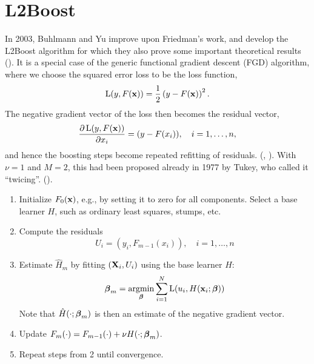 \section{L2Boost}
In 2003, Buhlmann and Yu improve upon Friedman's work, and develop the L2Boost algorithm for which they also prove some important theoretical results (\cite{buhlmann-yu}). It is a special case of the generic functional gradient descent (FGD) algorithm, where we choose the squared error loss to be the loss function,
\begin{equation*}
    \operatorname{L}(y,F(\mathbf{x}))=\frac{1}{2}\left(y-F(\mathbf{x})\right)^2.
\end{equation*}
The negative gradient vector of the loss then becomes the residual vector,
\begin{equation*}
    \frac{\partial\operatorname{L}(y,F(\mathbf{x}))}{\partial x_i}=(y-F(x_i)),\quad i=1,\dotsc,n,
\end{equation*}
and hence the boosting steps become repeated refitting of residuals. (\cite{friedman2001}, \cite{buhlmann-yu}). With $\nu=1$ and $M=2$, this had been proposed already in 1977 by Tukey, who called it ``twicing''. (\cite{tukey}).
\begin{enumerate}
    \item Initialize $F_0(\mathbf{x})$, e.g., by setting it to zero for all components. Select a base learner $H$, such as ordinary least squares, stumps, etc.
    \item Compute the residuals
        \begin{equation*}
            U_i=(y_i,F_{m-1}(x_i)),\quad i=1,\dotsc,n
        \end{equation*}
    \item Estimate $\hat{H}_m$ by fitting $(\mathbf{X}_i,U_i)$ using the base learner $H$:
        \begin{equation*}
            \boldsymbol{\beta}_m=\operatorname*{argmin}_{\boldsymbol{\beta}}\sum_{i=1}^N\operatorname{L}(u_i,H(\mathbf{x}_i;\boldsymbol{\beta}))
        \end{equation*}
        Note that $\hat{H}(\cdot;\boldsymbol{\beta}_m)$ is then an estimate of the negative gradient vector.
    \item Update $F_m(\cdot)=F_{m-1}(\cdot)+\nu H(\cdot;\boldsymbol{\beta}_m)$.
    \item Repeat steps from 2 until convergence.
\end{enumerate}
